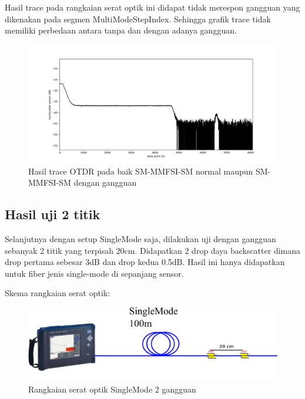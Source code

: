 \documentclass[12pt]{article}
\begin{document}
\begin{enumerate}
		Hasil trace pada rangkaian serat optik ini didapat tidak merespon gangguan yang dikenakan pada segmen MultiModeStepIndex.
		Sehingga grafik trace tidak memiliki perbedaan antara tanpa dan dengan adanya gangguan.
		
		\begin{figure}[!ht]
			\centering
			\captionsetup{justification=centering}
			\includegraphics[width=\linewidth]{images/Bab_4/Bab_4_3f1}
			\caption[Trace SM-MMFSI-SM ]{\small{Hasil trace OTDR pada baik SM-MMFSI-SM  normal maupun SM-MMFSI-SM  dengan gangguan}}
		\end{figure}
	
	\end{enumerate}

	\subsection{Hasil uji 2 titik}
	
	Selanjutnya dengan setup SingleMode saja, dilakukan uji dengan gangguan sebanyak 2 titik yang terpisah 20cm.
	Didapatkan 2 drop daya backscatter dimana drop pertama sebesar 3dB dan drop kedua 0.5dB.
	Hasil ini hanya didapatkan untuk fiber jenis single-mode di sepanjang sensor.
	
	\newpage
	Skema rangkaian serat optik:
	
	\begin{figure}[!ht]
		\centering
		\captionsetup{justification=centering}
		\includegraphics[width=0.7\linewidth]{images/Bab_4/sm2}
		\caption[Trace SMF-SMF]{\small{Rangkaian serat optik SingleMode 2 gangguan}}
	\end{figure}
\end{document}
